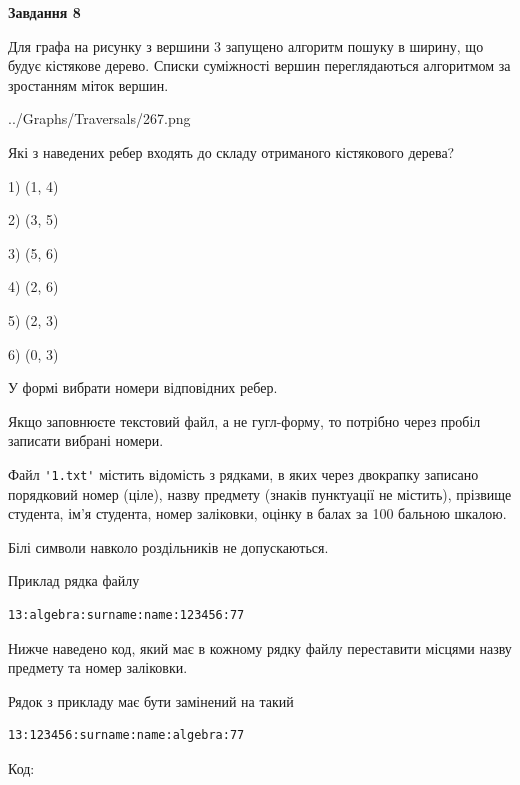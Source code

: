 \documentclass[12pt, ukrainian]{article}
\def\code#1{\Verb!#1!}
\begin{document}
{\begin {large}
{\begin {center}\textbf{Завдання 8}\end {center}}\par
Для графа на рисунку з вершини 3 запущено алгоритм пошуку в ширину, що будує кістякове дерево. Списки суміжності вершин переглядаються алгоритмом за зростанням міток вершин.\par
\begin{center}
	{../Graphs/Traversals/267.png}
\end{center}
\par Які з наведених ребер входять до складу отриманого кістякового дерева?\par
1) (1, 4)\par
2) (3, 5)\par
3) (5, 6)\par
4) (2, 6)\par
5) (2, 3)\par
6) (0, 3)\par
{\vskip 15pt} У формі вибрати номери відповідних ребер.


Якщо заповнюєте текстовий файл, а не гугл-форму, то потрібно через пробіл записа\-ти вибрані номери.\par
\newpage


Файл \code{'1.txt'} містить відомість з рядками, в яких через двокрапку записано поряд\-ковий номер (ціле), назву предмету (знаків пунктуації не містить), прізвище студента, ім'я студента, номер заліковки, оцінку в балах за 100 бальною шкалою.

Білі символи навколо роздільників не допускаються.

Приклад рядка файлу



\begin{verbatim}
13:algebra:surname:name:123456:77
\end{verbatim}


Нижче наведено код, який має в кожному рядку файлу переставити місцями назву предмету та номер заліковки.

Рядок з прикладу має бути замінений на такий



\begin{verbatim}
13:123456:surname:name:algebra:77
\end{verbatim}




Код:




\end{large}}
\end{document}

